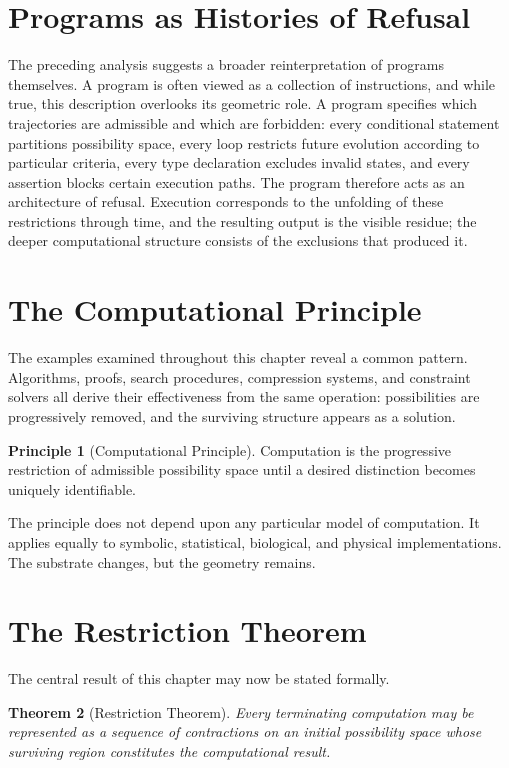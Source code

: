 \documentclass[11pt,oneside]{book}
\theoremstyle{plain}
\newtheorem{theorem}{Theorem}[chapter]
\theoremstyle{definition}
\newtheorem{principle}[theorem]{Principle}
\theoremstyle{remark}
\begin{document}
\section{Programs as Histories of Refusal}

The preceding analysis suggests a broader reinterpretation of programs themselves. A program is often viewed as a collection of instructions, and while true, this description overlooks its geometric role. A program specifies which trajectories are admissible and which are forbidden: every conditional statement partitions possibility space, every loop restricts future evolution according to particular criteria, every type declaration excludes invalid states, and every assertion blocks certain execution paths. The program therefore acts as an architecture of refusal. Execution corresponds to the unfolding of these restrictions through time, and the resulting output is the visible residue; the deeper computational structure consists of the exclusions that produced it.

\section{The Computational Principle}

The examples examined throughout this chapter reveal a common pattern. Algorithms, proofs, search procedures, compression systems, and constraint solvers all derive their effectiveness from the same operation: possibilities are progressively removed, and the surviving structure appears as a solution.

\begin{principle}[Computational Principle]
Computation is the progressive restriction of admissible possibility space until a desired distinction becomes uniquely identifiable.
\end{principle}

The principle does not depend upon any particular model of computation. It applies equally to symbolic, statistical, biological, and physical implementations. The substrate changes, but the geometry remains.

\section{The Restriction Theorem}

The central result of this chapter may now be stated formally.

\begin{theorem}[Restriction Theorem]
Every terminating computation may be represented as a sequence of contractions on an initial possibility space whose surviving region constitutes the computational result.
\end{theorem}
\end{document}
